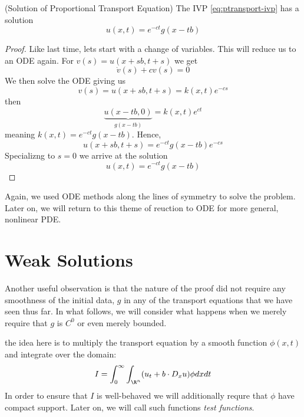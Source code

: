 \documentclass{bkcnotes}
\begin{document}
\begin{nthm}(Solution of Proportional Transport Equation)
  The IVP \eqref{eq:ptransport-ivp} has a solution
  \begin{equation}
    \label{eq:ptransport-sol}
    u(x,t) = e^{-ct}g(x-tb)
  \end{equation}
\end{nthm}
\begin{proof}
  Like last time, lets start with a change of variables. This will
  reduce us to an ODE again. For $v(s) = u(x+sb,t+s)$ we get
  \begin{equation}
    \label{eq:trans-ode}
    \dot{v}(s) + cv(s) = 0
  \end{equation}
  We then solve the ODE giving us
  \begin{equation}
    \label{eq:ode-sol}
    v(s) = u(x+sb,t+s) = k(x,t)e^{-cs}
  \end{equation}
  then
  \begin{equation}
    \label{eq:u-sol}
    \underbrace{u(x-tb,0)}_{g(x-tb)} = k(x,t)e^{ct}
  \end{equation}
  meaning $k(x,t) = e^{-ct}g(x-tb)$. Hence,
  \begin{equation}
    \label{eq:u-sol}
    u(x+sb,t+s) = e^{-ct}g(x-tb)e^{-cs}
  \end{equation}
  Specializng to $s=0$ we arrive at the solution
  \begin{equation}
    \label{eq:ptransport-sol}
    u(x,t) = e^{-ct}g(x-tb)
  \end{equation}
\end{proof}
Again, we used ODE methods along the lines of symmetry to solve the
problem. Later on, we will return to this theme of reuction to ODE for
more general, nonlinear PDE.

\section{Weak Solutions}
Another useful observation is that the nature of the proof did not
require any smoothness of the initial data, $g$ in any of the
transport equations that we have seen thus far. In what follows, we
will consider what happens when we merely require that $g$ is $C^0$ or
even merely bounded.

the idea here is to multiply the transport equation by a smooth
function $\phi(x,t)$ and integrate over the domain:
\begin{equation}
  \label{eq:i}
  I = \int_0^\infty\int_{\R^n} (u_t + b\cdot D_xu)\phi dxdt
\end{equation}
In order to ensure that $I$ is well-behaved we will additionally
requre that $\phi$ have compact support. Later on, we will call such
functions \emph{test functions}.
\end{document}
